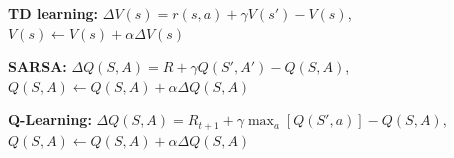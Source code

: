 \textbf{TD learning:} $\Delta V(s) = r(s,a) + \gamma V(s') - V(s)$, $V(s) \leftarrow V(s) + \alpha \Delta V(s)$\\

\textbf{SARSA:} $\Delta Q(S,A) = R + \gamma Q(S', A') - Q(S, A)$, $Q(S, A) \leftarrow Q(S, A) + \alpha \Delta Q(S, A)$\\

\textbf{Q-Learning:} $\Delta Q(S,A) = R_{t+1} + \gamma \max_a[Q(S', a)] - Q(S, A)$, $Q(S,A) \leftarrow Q(S, A) + \alpha \Delta Q(S, A)$\\

